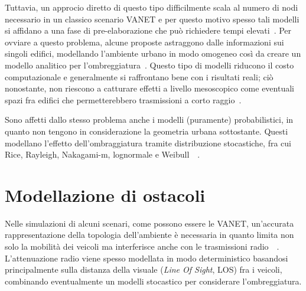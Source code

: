 Tuttavia, un approcio diretto di questo tipo difficilmente scala al numero di nodi necessario in un classico scenario VANET e per questo motivo
spesso tali modelli si affidano a una fase di pre-elaborazione che può richiedere tempi elevati~\cite{Stepanov:2008:IMR:1293378.1293656}.
Per ovviare a questo problema, alcune proposte astraggono dalle informazioni sui singoli edifici, modellando l'ambiente urbano in modo omogeneo
così da creare un modello analitico per l'ombreggiatura~\cite{1492678}.
Questo tipo di modelli riducono il costo computazionale e generalmente si raffrontano bene con i risultati reali;
ciò nonostante, non riescono a catturare effetti a livello mesoscopico come eventuali spazi fra edifici che permetterebbero trasmissioni a corto raggio~\cite{Giordano:2010:CST:1860058.1860065}.

Sono affetti dallo stesso problema anche i modelli (puramente) probabilistici, in quanto non tengono in considerazione la geometria urbana sottostante.
Questi modellano l'effetto dell'ombraggiatura tramite distribuzione stocastiche, fra cui Rice, Rayleigh, Nakagami-m, lognormale e Weibull~\cite{6554832}~\cite{Rappaport:2001:WCP:559977}.
%
\section{Modellazione di ostacoli}\label{sec:modellazione-ostacoli}
Nelle simulazioni di alcuni scenari, come possono essere le VANET, un'accurata rappresentazione della topologia dell'ambiente è necessaria
in quanto limita non solo la mobilità dei veicoli ma interferisce anche con le trasmissioni radio~\cite{7543980}~\cite{amjad2015impact}.
L'attenuazione radio viene spesso modellata in modo deterministico basandosi principalmente sulla distanza della visuale (\textit{Line Of Sight}, LOS)
fra i veicoli, combinando eventualmente un modelli stocastico per considerare l'ombreggiatura.

